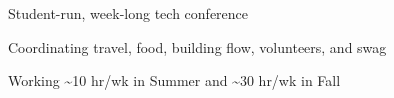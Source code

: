 \documentclass[]{deedy-resume-openfont}
\begin{document}
\begin{minipage}[t]{0.66\textwidth}
\begin{tightemize}
\item Student-run, week-long tech conference
\item Coordinating travel, food, building flow, volunteers, and swag
\item Working \textasciitilde10 hr/wk in Summer and \textasciitilde30 hr/wk in Fall
\end{tightemize}

\end{minipage}
\end{document}

